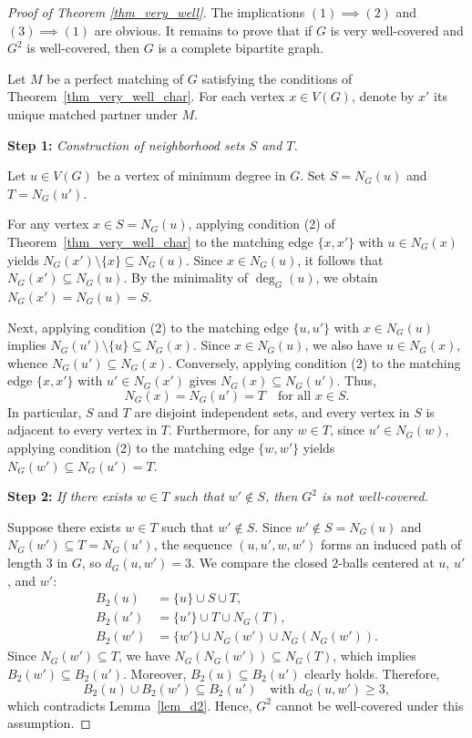 \documentclass[12pt]{amsart}
\numberwithin{equation}{section}
\theoremstyle{definition}
\begin{document}
\begin{proof}[Proof of Theorem \ref{thm_very_well}]
The implications $(1) \implies (2)$ and $(3) \implies (1)$ are obvious. It remains to prove that if $G$ is very well-covered and $G^2$ is well-covered, then $G$ is a complete bipartite graph.

Let $M$ be a perfect matching of $G$ satisfying the conditions of Theorem~\ref{thm_very_well_char}. For each vertex $x \in V(G)$, denote by $x'$ its unique matched partner under $M$. 

\smallskip
\noindent\textbf{Step 1:} \emph{Construction of neighborhood sets $S$ and $T$.}

Let $u \in V(G)$ be a vertex of minimum degree in $G$. Set $S = N_G(u)$ and $T = N_G(u')$. 

For any vertex $x \in S = N_G(u)$, applying condition (2) of Theorem~\ref{thm_very_well_char} to the matching edge $\{x, x'\}$ with $u \in N_G(x)$ yields $N_G(x') \setminus \{x\} \subseteq N_G(u)$. Since $x \in N_G(u)$, it follows that $N_G(x') \subseteq N_G(u)$. By the minimality of $\deg_G(u)$, we obtain $N_G(x') = N_G(u) = S$.

Next, applying condition (2) to the matching edge $\{u, u'\}$ with $x \in N_G(u)$ implies $N_G(u') \setminus \{u\} \subseteq N_G(x)$. Since $x \in N_G(u)$, we also have $u \in N_G(x)$, whence $N_G(u') \subseteq N_G(x)$. Conversely, applying condition (2) to the matching edge $\{x, x'\}$ with $u' \in N_G(x')$ gives $N_G(x) \subseteq N_G(u')$. Thus, 
\[
N_G(x) = N_G(u') = T \quad \text{for all } x \in S.
\]
In particular, $S$ and $T$ are disjoint independent sets, and every vertex in $S$ is adjacent to every vertex in $T$. Furthermore, for any $w \in T$, since $u' \in N_G(w)$, applying condition (2) to the matching edge $\{w, w'\}$ yields $N_G(w') \subseteq N_G(u') = T$.

\smallskip
\noindent\textbf{Step 2:} \emph{If there exists $w \in T$ such that $w' \notin S$, then $G^2$ is not well-covered.}

Suppose there exists $w \in T$ such that $w' \notin S$. Since $w' \notin S = N_G(u)$ and $N_G(w') \subseteq T = N_G(u')$, the sequence $(u, u', w, w')$ forms an induced path of length $3$ in $G$, so $d_G(u, w') = 3$. We compare the closed $2$-balls centered at $u$, $u'$, and $w'$:
\begin{align*}
    B_2(u) &= \{u\} \cup S \cup T, \\
    B_2(u') &= \{u'\} \cup T \cup N_G(T), \\
    B_2(w') &= \{w'\} \cup N_G(w') \cup N_G(N_G(w')).
\end{align*}
Since $N_G(w') \subseteq T$, we have $N_G(N_G(w')) \subseteq N_G(T)$, which implies $B_2(w') \subseteq B_2(u')$. Moreover, $B_2(u) \subseteq B_2(u')$ clearly holds. Therefore,
\[
B_2(u) \cup B_2(w') \subseteq B_2(u') \quad \text{with } d_G(u, w') \ge 3,
\]
which contradicts Lemma~\ref{lem_d2}. Hence, $G^2$ cannot be well-covered under this assumption.


\end{proof}
\end{document}
